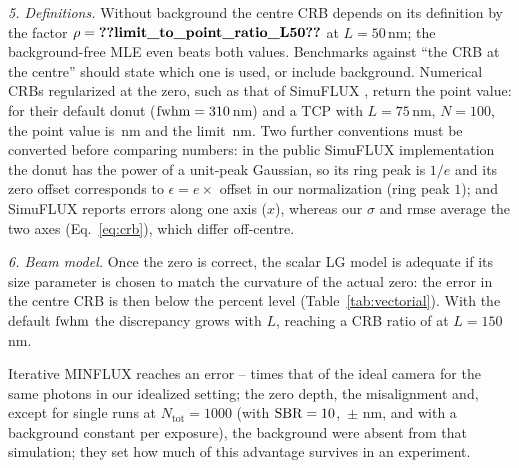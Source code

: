 \emph{5. Definitions.} Without background the centre CRB depends on its definition by the factor
$\rho=\pnum{limit_to_point_ratio_L50}\src{limit_to_point_ratio_L50}$ at $L=50$\,nm; the
background-free MLE even beats both values. Benchmarks against ``the CRB at the centre'' should
state which one is used, or include background. Numerical CRBs regularized at the zero, such as
that of SimuFLUX \cite{MarinRies2026}, return the point value:
for their default donut ($\mathrm{fwhm}=310$\,nm) and a TCP with $L=75$\,nm, $N=100$, the point value is
\,nm and
the limit \,nm.
Two further conventions must be converted before comparing numbers: in the public SimuFLUX
implementation the donut has the power of a unit-peak Gaussian, so its ring peak is $1/e$ and its
zero offset corresponds to $\epsilon=e\times$ offset in our normalization (ring peak $1$);
and SimuFLUX reports errors along one axis ($x$), whereas our $\sigma$ and rmse average the two
axes (Eq.~\eqref{eq:crb}), which differ off-centre.

\emph{6. Beam model.} Once the zero is correct, the scalar LG model is adequate if its size
parameter is chosen to match the curvature of the actual zero: the error in the centre CRB is
then below the percent level (Table~\ref{tab:vectorial}). With the default $\mathrm{fwhm}$ the
discrepancy grows with $L$, reaching a CRB ratio of
 at $L=150$\,nm.

Iterative MINFLUX reaches an error
--
times that of the ideal camera for the same photons in our idealized setting; the zero depth,
the misalignment and, except for single runs at $N_{\mathrm{tot}}=1000$ (with $\mathrm{SBR}=10$,
\,$\pm$\,\,nm,
and with a background constant per exposure), the background were absent from that simulation;
they set how much of this advantage survives in an experiment.
